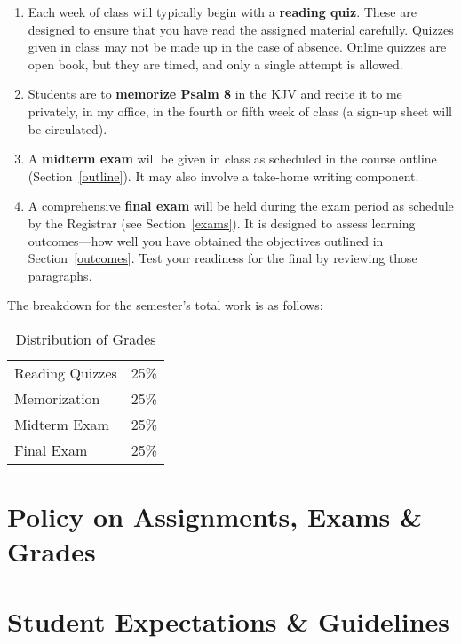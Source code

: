 \documentclass[titlepage]{article}
\begin{document}
\begin{enumerate}
 \item Each week of class will typically begin with a \textbf{reading
   quiz}. These are designed to ensure that you have read the assigned
   material carefully. Quizzes given in class may not be made up in the
   case of absence. Online quizzes are open book, but they are timed,
   and only a single attempt is allowed.
 \item Students are to \textbf{memorize Psalm 8} in the KJV and recite
   it to me privately, in my office, in the fourth or fifth week of
   class (a sign-up sheet will be circulated).
 \item A \textbf{midterm exam} will be given in class as scheduled in
   the course outline (Section~\ref{outline}). It may also involve a
   take-home writing component.
 \item A comprehensive \textbf{final exam} will be held during the exam
   period as schedule by the Registrar (see Section~\ref{exams}). It is
   designed to assess learning outcomes---how well you have obtained the
   objectives outlined in Section~\ref{outcomes}. Test your readiness
   for the final by reviewing those paragraphs.
\end{enumerate}

The breakdown for the semester's total work is as follows:

\begin{table}[htbp]
  \centering
  \begin{tabular}{lr}
    \toprule
    Reading Quizzes & 25\% \\
    Memorization    & 25\% \\
    Midterm Exam    & 25\% \\
    Final Exam      & 25\% \\
    \bottomrule
  \end{tabular}
  \caption{Distribution of Grades}
  \label{distribution}
\end{table}


\section{Policy on Assignments, Exams \& Grades}
\label{policy}






\section{Student Expectations \& Guidelines}
\label{expectations}
\end{document}
